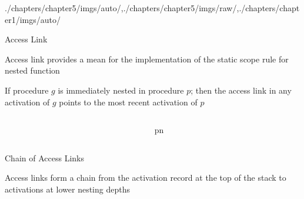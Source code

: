 \begin{graphicspathcontext}{{./chapters/chapter5/imgs/auto/},{./chapters/chapter5/imgs/raw/},{./chapters/chapter1/imgs/auto/}}
\begin{bibunit}[apalike]
\begin{frame}{Access Link}
	\begin{small}
		\begin{definition}
			Access link provides a mean for the implementation of the static scope rule for nested function
		\end{definition}
		If procedure $g$ is immediately nested in procedure $p$; then the access link in any activation of $g$ points to the most recent activation of $p$ \\[.1cm]
	\end{small}
	\begin{columns}
		\begin{column}{.5\linewidth}
		\end{column}
		\begin{column}{.3\linewidth}
			\begin{tiny}
				\begin{myprocedure}{p}{n}
				\end{myprocedure}
			\end{tiny}
		\end{column}
	\end{columns}
\end{frame}

\begin{frame}{Chain of Access Links}
	\begin{definition}
		Access links form a chain from the activation record at the top of the stack to activations at lower nesting depths
	\end{definition}
	\vspace{1cm}
\end{frame}


\end{bibunit}
\end{graphicspathcontext}
